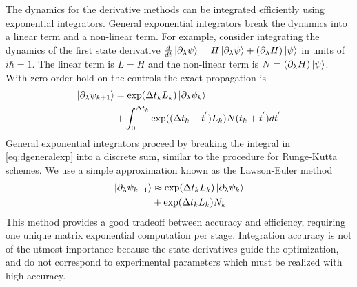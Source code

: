 The dynamics for the derivative methods can be integrated efficiently using exponential integrators.
General exponential integrators break the dynamics into a linear term and a non-linear term. For example, consider
integrating the dynamics of the first state derivative $\frac{d}{dt} \ket{\partial_{\lambda} \psi} =
H \ket{\partial_{\lambda} \psi} + (\partial_{\lambda} H) \ket{\psi}$ in units of $i\hbar = 1$.
The linear term is $L = H$ and the non-linear term is $N = (\partial_{\lambda} H) \ket{\psi}$.
With zero-order hold on the controls the exact propagation is
\begin{equation}
  \label{eq:dgeneralexp}
  \begin{aligned}
    \ket{\partial_{\lambda} \psi_{k + 1}} &= \exp(\Delta t_{k} L_{k}) \ket{\partial_{\lambda} \psi_{k}}\\
    &+ \int_{0}^{\Delta t_{k}} \exp((\Delta t_{k} - t^{'})L_{k}) N(t_{k} + t^{'}) dt^{'}\\
  \end{aligned}
\end{equation}
General exponential integrators proceed by breaking the integral in \eqref{eq:dgeneralexp}
into a discrete sum, similar to the procedure
for Runge-Kutta schemes. We use a simple approximation known as the Lawson-Euler
method \cite{berland2005solving}
\begin{equation}
  \begin{aligned}
    \ket{\partial_{\lambda} \psi_{k + 1}} &\approx \exp(\Delta t_{k}L_{k}) \ket{\partial_{\lambda} \psi_{k}}\\
    &+ \exp(\Delta t_{k}L_{k}) N_{k}\\
  \end{aligned}
\end{equation}
This method provides a good tradeoff between accuracy and efficiency, requiring one unique matrix
exponential computation per stage. Integration accuracy is not of the utmost importance because the
state derivatives guide the optimization, and do not correspond to experimental parameters
which must be realized with high accuracy.





